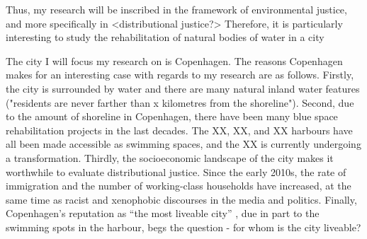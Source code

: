 \documentclass{article}
\begin{document}

Thus, my research will be inscribed in the framework of environmental justice, and more specifically in <distributional justice?>
Therefore, it is particularly interesting to study the rehabilitation of natural bodies of water in a city 






The city I will focus my research on is Copenhagen.
The reasons Copenhagen makes for an interesting case with regards to my research are as follows. Firstly, the city is surrounded by water and there are many natural inland water features ("residents are never farther than x kilometres from the shoreline"). 
Second, due to the amount of shoreline in Copenhagen, there have been many blue space rehabilitation projects in the last decades. The XX, XX, and XX harbours have all been made accessible as swimming spaces, and the XX is currently undergoing a transformation.
Thirdly, the socioeconomic landscape of the city makes it worthwhile to evaluate distributional justice. Since the early 2010s, the rate of immigration and the number of working-class households have increased, at the same time as racist and xenophobic discourses in the media and politics. 
Finally, Copenhagen's reputation as ``the most liveable city'' \parencite{visitdenmark_2021}, due in part to the swimming spots in the harbour, begs the question - for whom is the city liveable?



\printbibliography
\end{document}
